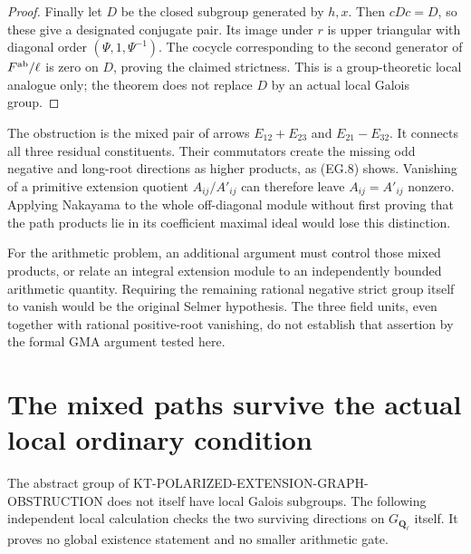 \documentclass[11pt,a4paper]{article}
\theoremstyle{definition}
\begin{document}
\begin{proof}
Finally let $D$ be the closed subgroup generated by
$h,x$.  Then $cDc=D$, so these give a designated
conjugate pair.  Its image under $r$ is upper
triangular with diagonal order $(\Psi,1,\Psi^{-1})$.
The cocycle corresponding to the second generator
of $F^{\rm ab}/\ell$ is zero on $D$, proving the
claimed strictness.  This is a group-theoretic local
analogue only; the theorem does not replace $D$ by
an actual local Galois group.
\end{proof}

The obstruction is the mixed pair of arrows
$E_{12}+E_{23}$ and $E_{21}-E_{32}$.  It connects all
three residual constituents.  Their commutators create
the missing odd negative and long-root directions as
higher products, as (EG.8) shows.  Vanishing of a
primitive extension quotient $A_{ij}/A'_{ij}$ can
therefore leave $A_{ij}=A'_{ij}$ nonzero.  Applying
Nakayama to the whole off-diagonal module without
first proving that the path products lie in its
coefficient maximal ideal would lose this distinction.

For the arithmetic problem, an additional argument
must control those mixed products, or relate an
integral extension module to an independently bounded
arithmetic quantity.  Requiring the remaining rational
negative strict group itself to vanish would be the
original Selmer hypothesis.  The three field units,
even together with rational positive-root vanishing,
do not establish that assertion by the formal GMA
argument tested here.



\section{The mixed paths survive the actual local ordinary condition}
\label{sec:kt-local-mixed-paths}

The abstract group of KT-POLARIZED-EXTENSION-GRAPH-OBSTRUCTION
does not itself have local Galois subgroups.  The following
independent local calculation checks the two surviving
directions on $G_{\mathbf Q_\ell}$ itself.  It proves no
global existence statement and no smaller arithmetic gate.
\end{document}

